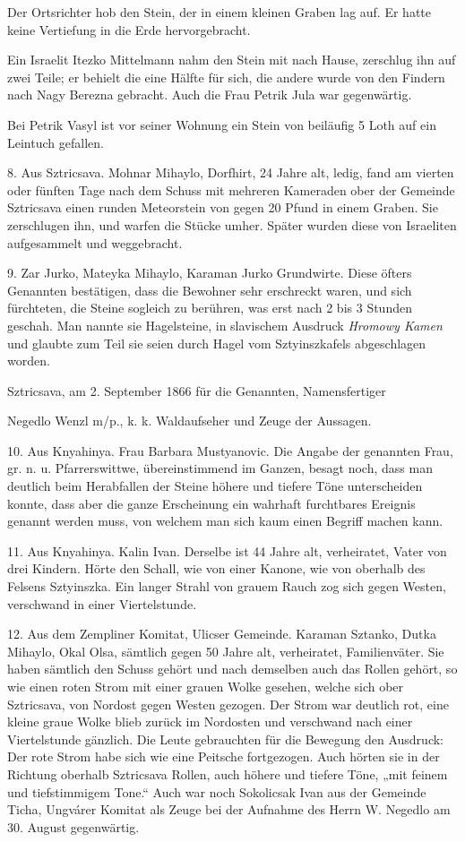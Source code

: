 \documentclass[a4paper, 11pt, oneside, german]{article}
\begin{document}
Der Ortsrichter hob den Stein, der in einem kleinen Graben lag auf. Er hatte keine Vertiefung in die Erde hervorgebracht.

Ein Israelit Itezko Mittelmann nahm den Stein mit nach Hause, zerschlug ihn auf zwei Teile; er behielt die eine Hälfte für sich, die andere wurde von den Findern nach Nagy Berezna gebracht. Auch die Frau Petrik Jula war gegenwärtig.

Bei Petrik Vasyl ist vor seiner Wohnung ein Stein von beiläufig 5 Loth auf ein Leintuch gefallen.

8. Aus Sztricsava. Mohnar Mihaylo, Dorfhirt, 24 Jahre alt, ledig, fand am vierten oder fünften Tage nach dem Schuss mit mehreren Kameraden ober der Gemeinde Sztricsava einen runden Meteorstein von gegen 20 Pfund in einem Graben. Sie zerschlugen ihn, und warfen die Stücke umher. Später wurden diese von Israeliten aufgesammelt und weggebracht.

9. Zar Jurko, Mateyka Mihaylo, Karaman Jurko Grundwirte. Diese öfters Genannten bestätigen, dass die Bewohner sehr erschreckt waren, und sich fürchteten, die Steine sogleich zu berühren, was erst nach 2 bis 3 Stunden geschah. Man nannte sie Hagelsteine, in slavischem Ausdruck \emph{Hromowy Kamen} und glaubte zum Teil sie seien durch Hagel vom Sztyinszkafels abgeschlagen worden.

\hspace*{10mm}Sztricsava, am 2. September 1866 für die Genannten, Namensfertiger 

\hspace*{15mm}Negedlo Wenzl m/p., k. k. Waldaufseher und Zeuge der Aussagen.

10. Aus Knyahinya. Frau Barbara Mustyanovic. Die Angabe der genannten Frau, gr. n. u. Pfarrerswittwe, übereinstimmend im Ganzen, besagt noch, dass man deutlich beim Herabfallen der Steine höhere und tiefere Töne unterscheiden konnte, dass aber die ganze Erscheinung ein wahrhaft furchtbares Ereignis genannt werden muss, von welchem man sich kaum einen Begriff machen kann.

11. Aus Knyahinya. Kalin Ivan. Derselbe ist 44 Jahre alt, verheiratet, Vater von drei Kindern. Hörte den Schall, wie von einer Kanone, wie von oberhalb des Felsens Sztyinszka. Ein langer Strahl von grauem Rauch zog sich gegen Westen, verschwand in einer Viertelstunde.

12. Aus dem Zempliner Komitat, Ulicser Gemeinde. Karaman Sztanko, Dutka Mihaylo, Okal Olsa, sämtlich gegen 50 Jahre alt, verheiratet, Familienväter. Sie haben sämtlich den Schuss gehört und nach demselben auch das Rollen gehört, so wie einen roten Strom mit einer grauen Wolke gesehen, welche sich ober Sztricsava, von Nordost gegen Westen gezogen. Der Strom war deutlich rot, eine kleine graue Wolke blieb zurück im Nordosten und verschwand nach einer Viertelstunde gänzlich. Die Leute gebrauchten für die Bewegung den Ausdruck: Der rote Strom habe sich wie eine Peitsche fortgezogen. Auch hörten sie in der Richtung oberhalb Sztricsava Rollen, auch höhere und tiefere Töne, „mit feinem und tiefstimmigem Tone.“ Auch war noch Sokolicsak Ivan aus der Gemeinde Ticha, Ungvárer Komitat als Zeuge bei der Aufnahme des Herrn W. Negedlo am 30. August gegenwärtig.
\end{document}
